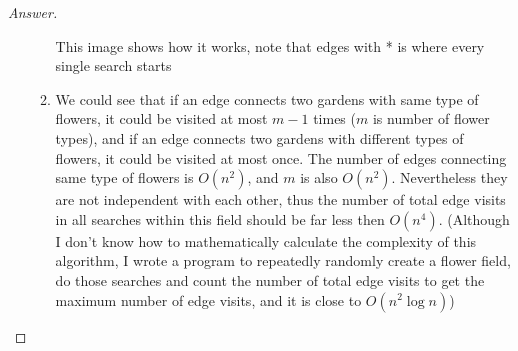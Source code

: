 \documentclass{article}
\theoremstyle{plain}
\newenvironment{answer}[1][Answer]
    {\begin{proof}[#1]{$ $}\renewcommand\qedsymbol{$\vartriangle$}}
    {\end{proof}}
\begin{document}
\begin{answer}
\begin{enumerate}
\begin{enumerate}
            This image shows how it works, note that edges with * is where every single search starts
            \item
            We could see that if an edge connects two gardens with same type of flowers, it could be visited at most $m-1$ times ($m$ is number of flower types), and if an edge connects two gardens with different types of flowers, it could be visited at most once. The number of edges connecting same type of flowers is $O(n^2)$, and $m$ is also $O(n^2)$. Nevertheless they are not independent with each other, thus the number of total edge visits in all searches within this field should be far less then $O(n^4)$. (Although I don't know how to mathematically calculate the complexity of this algorithm, I wrote a program to repeatedly randomly create a flower field, do those searches and count the number of total edge visits to get the maximum number of edge visits, and it is close to $O(n^2 \log n)$)
        \end{enumerate}
    \end{enumerate}
\end{answer}
\end{document}
